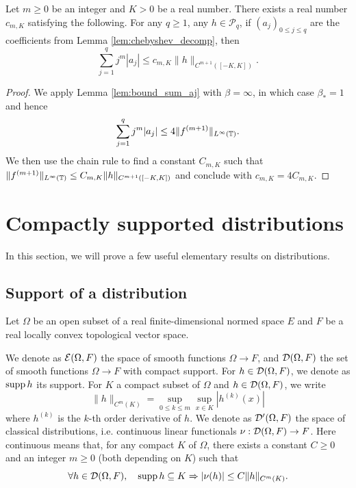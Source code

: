 \begin{corollary}
  \label{coro:bound_sum_aj}
  Let $m \geq 0$ be an integer and $K > 0$ be a real number.
  There exists a real number $c_{m,K}$ satisfying the following.
  For any $q \geq 1$, any
  $h \in \mathcal{P}_q$, if $(a_j)_{0 \leq j \leq q}$ are
  the coefficients from Lemma \ref{lem:chebyshev_decomp},
  then
  \begin{equation*}
    \sum_{j=1}^q j^m |a_j| \leq c_{m,K} \|h\|_{C^{m+1}([-K,K])}.
  \end{equation*}
\end{corollary}

\begin{proof}
  We apply Lemma \ref{lem:bound_sum_aj} with $\beta = \infty$, in which case $\beta_*=1$
  and hence $$\sum_{j=1}^q j^m |a_j| \leq 4 \|f^{(m+1)}\|_{L^\infty(\tor)}.$$
  We then use the chain rule to find a constant $C_{m,K}$ such that
  $\|f^{(m+1)}\|_{L^\infty(\tor)} \leq C_{m,K} \|h\|_{C^{m+1}([-K,K])}$
  and conclude with $c_{m,K}=4C_{m,K}$.
\end{proof}

\section{Compactly supported distributions}

In this section, we will prove a few useful elementary results on distributions.

\subsection{Support of a distribution}

Let $\Omega$ be an open subset of a real finite-dimensional normed space $E$
and $F$ be a real locally convex topological vector space.

We denote as $\smooth[\Omega, F]$ the space of smooth functions $\Omega \rightarrow F$, and
$\testfunc[\Omega, F]$
the set of smooth functions $\Omega \rightarrow F$ with compact support.
For $h \in \testfunc[\Omega, F]$, we denote as $\supp h$ its support.
For $K$ a compact subset of $\Omega$ and $h \in \testfunc[\Omega, F]$, we write
\begin{equation*}
  \|h\|_{C^m(K)} = \sup_{0 \leq k \leq m} \sup_{x \in K} |h^{(k)}(x)|
\end{equation*}
where $h^{(k)}$ is the $k$-th order derivative of $h$.
We denote as $\distrib[\Omega, F]$ the space of classical distributions, i.e. continuous
linear functionals $\nu : \testfunc[\Omega, F] \rightarrow F$.
Here continuous means that, for any compact $K$ of $\Omega$,
there exists a constant $C \geq 0$ and an integer $m \geq 0$ (both depending on $K$) such that
\begin{equation*}
  \forall h \in \testfunc[\Omega,F], \quad
  \supp h \subseteq K \Rightarrow  |\nu(h)| \leq C \|h\|_{C^m(K)}.
\end{equation*}

